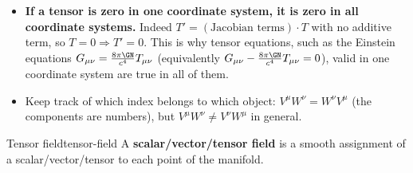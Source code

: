 \begin{remarkbox}[Remarks]
\begin{itemize}
\item \textbf{If a tensor is zero in one coordinate system, it is zero in all coordinate systems.} Indeed $T'=(\text{Jacobian terms})\cdot T$ with no additive term, so $T=0\Rightarrow T'=0$. This is why tensor equations, such as the Einstein equations $G_{\mu\nu}=\frac{8\pi\GN}{c^4}T_{\mu\nu}$ (equivalently $G_{\mu\nu}-\frac{8\pi\GN}{c^4}T_{\mu\nu}=0$), valid in one coordinate system are true in all of them.
\item Keep track of which index belongs to which object: $V^\mu W^\nu=W^\nu V^\mu$ (the components are numbers), but $V^\mu W^\nu\neq V^\nu W^\mu$ in general.
\end{itemize}
\end{remarkbox}

\begin{definition}{Tensor field}{tensor-field}
A \textbf{scalar/vector/tensor field} is a smooth assignment of a scalar/vector/tensor to each point of the manifold.
\end{definition}
